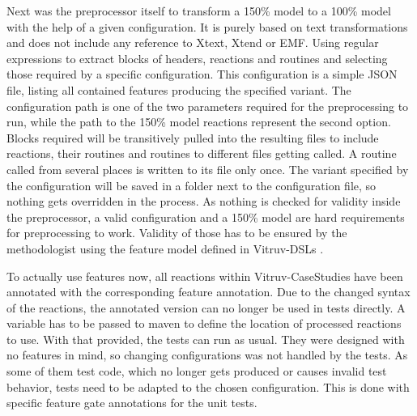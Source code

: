 Next was the preprocessor itself to transform a 150\% model to a 100\% model with the help of a given configuration.
It is purely based on text transformations and does not include any reference to Xtext, Xtend or EMF.
Using regular expressions to extract blocks of headers, reactions and routines and selecting those required by a specific configuration.
This configuration is a simple JSON file, listing all contained features producing the specified variant.
The configuration path is one of the two parameters required for the preprocessing to run, while the path to the 150\% model reactions represent the second option.
Blocks required will be transitively pulled into the resulting files to include reactions, their routines and routines to different files getting called.
A routine called from several places is written to its file only once.
The variant specified by the configuration will be saved in a folder next to the configuration file, so nothing gets overridden in the process.
As nothing is checked for validity inside the preprocessor, a valid configuration and a 150\% model are hard requirements for preprocessing to work.
Validity of those has to be ensured by the methodologist using the feature model defined in Vitruv-DSLs \cite{vitruv-dsls-fork}.

To actually use features now, all reactions within Vitruv-CaseStudies \cite{vitruv-casestudies-fork} have been annotated with the corresponding feature annotation.
Due to the changed syntax of the reactions, the annotated version can no longer be used in tests directly.
A variable has to be passed to maven to define the location of processed reactions to use.
With that provided, the tests can run as usual.
They were designed with no features in mind, so changing configurations was not handled by the tests.
As some of them test code, which no longer gets produced or causes invalid test behavior, tests need to be adapted to the chosen configuration.
This is done with specific feature gate annotations for the unit tests.



